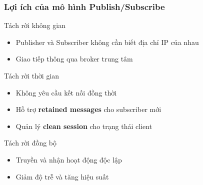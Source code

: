 \begin{frame}
\frametitle{Lợi ích của mô hình Publish/Subscribe}

\begin{block}{Tách rời không gian}
\begin{itemize}
\item Publisher và Subscriber không cần biết địa chỉ IP của nhau
\item Giao tiếp thông qua broker trung tâm
\end{itemize}
\end{block}

\begin{block}{Tách rời thời gian}
\begin{itemize}
\item Không yêu cầu kết nối đồng thời
\item Hỗ trợ \textbf{retained messages} cho subscriber mới
\item Quản lý \textbf{clean session} cho trạng thái client
\end{itemize}
\end{block}

\begin{block}{Tách rời đồng bộ}
\begin{itemize}
\item Truyền và nhận hoạt động độc lập
\item Giảm độ trễ và tăng hiệu suất
\end{itemize}
\end{block}

\end{frame}


